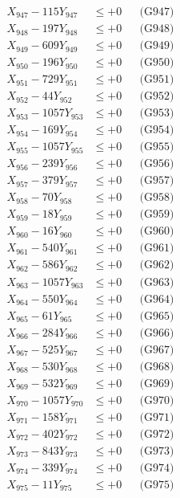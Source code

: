 \documentclass[a4paper,10pt]{article}
\begin{document}
{\begin{align}
X_{947} - 115Y_{947} &\leq +0 && \text{(G947)} \\
X_{948} - 197Y_{948} &\leq +0 && \text{(G948)} \\
X_{949} - 609Y_{949} &\leq +0 && \text{(G949)} \\
X_{950} - 196Y_{950} &\leq +0 && \text{(G950)} \\
\allowbreak
X_{951} - 729Y_{951} &\leq +0 && \text{(G951)} \\
X_{952} - 44Y_{952} &\leq +0 && \text{(G952)} \\
X_{953} - 1057Y_{953} &\leq +0 && \text{(G953)} \\
X_{954} - 169Y_{954} &\leq +0 && \text{(G954)} \\
X_{955} - 1057Y_{955} &\leq +0 && \text{(G955)} \\
X_{956} - 239Y_{956} &\leq +0 && \text{(G956)} \\
X_{957} - 379Y_{957} &\leq +0 && \text{(G957)} \\
X_{958} - 70Y_{958} &\leq +0 && \text{(G958)} \\
X_{959} - 18Y_{959} &\leq +0 && \text{(G959)} \\
X_{960} - 16Y_{960} &\leq +0 && \text{(G960)} \\
\allowbreak
X_{961} - 540Y_{961} &\leq +0 && \text{(G961)} \\
X_{962} - 586Y_{962} &\leq +0 && \text{(G962)} \\
X_{963} - 1057Y_{963} &\leq +0 && \text{(G963)} \\
X_{964} - 550Y_{964} &\leq +0 && \text{(G964)} \\
X_{965} - 61Y_{965} &\leq +0 && \text{(G965)} \\
X_{966} - 284Y_{966} &\leq +0 && \text{(G966)} \\
X_{967} - 525Y_{967} &\leq +0 && \text{(G967)} \\
X_{968} - 530Y_{968} &\leq +0 && \text{(G968)} \\
X_{969} - 532Y_{969} &\leq +0 && \text{(G969)} \\
X_{970} - 1057Y_{970} &\leq +0 && \text{(G970)} \\
\allowbreak
X_{971} - 158Y_{971} &\leq +0 && \text{(G971)} \\
X_{972} - 402Y_{972} &\leq +0 && \text{(G972)} \\
X_{973} - 843Y_{973} &\leq +0 && \text{(G973)} \\
X_{974} - 339Y_{974} &\leq +0 && \text{(G974)} \\
X_{975} - 11Y_{975} &\leq +0 && \text{(G975)} \\

\end{align}}
\end{document}
